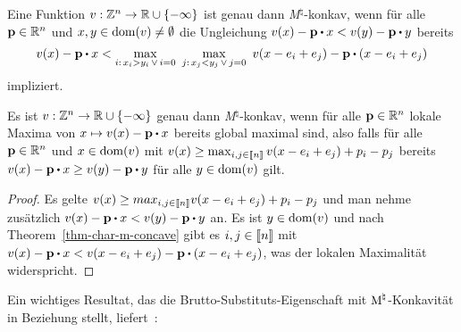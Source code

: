 \begin{theorem}[\cite{}]\label{thm-char-m-concave}
	Eine Funktion $v:\mathbb{Z}^n \rightarrow \mathbb{R} \cup \{ -\infty \}$ ist genau dann \emph{M}$^\natural$-konkav, wenn für alle $\mathbf{p}\in\mathbb{R}^n$ und $x,y\in\operatorname{dom}(v)\neq\emptyset$ die Ungleichung $v(x) - \fp\bcdot x < v(y) - \fp \bcdot y$ bereits \[ 
		v(x) - \fp\bcdot x < 
			\max_{i:\, x_i > y_i \,  \vee \, i = 0} \,\,
				\max_{j:\, x_j < y_j \, \vee \, j=0} \,\,
					v(x - e_i + e_j) - \fp \bcdot (x - e_i + e_j)
	\]
	impliziert.
\end{theorem}
\begin{korollar}\label{cor-concave-local-global}
	Es ist $v: \mathbb{Z}^n \rightarrow \mathbb{R} \cup \{ -\infty \}$ genau dann \emph{M}$^\natural$-konkav, wenn für alle $\mathbf{p}\in\mathbb{R}^n$ lokale Maxima von $x \mapsto v(x) - \fp \bcdot x$ bereits global maximal sind, also 
	falls für alle $\mathbf{p}\in\mathbb{R}^n$ und $x\in\operatorname{dom}(v)$ mit $
	v(x)\geq \max_{i,j\in\left\llbracket n \right\rrbracket} v(x - e_i + e_j) + p_i - p_j
	$
	bereits $v(x) - \fp \bcdot x \geq v(y) - \fp \bcdot y$ für alle $y\in\operatorname{dom}(v)$ gilt.
\end{korollar}
\begin{proof}
	Es gelte $v(x) \geq max_{i,j\in\left\llbracket n \right\rrbracket} v(x - e_i + e_j) + p_i - p_j$ und man nehme zusätzlich $v(x) - \fp\bcdot x < v(y) - \fp \bcdot y$ an.
	Es ist $y\in\operatorname{dom}(v)$ und nach Theorem~\ref{thm-char-m-concave} gibt es $i,j\in\left\llbracket n \right\rrbracket$ mit $v(x) - \fp \bcdot x < v(x - e_i + e_j) - \fp\bcdot (x - e_i + e_j)$, was der lokalen Maximalität widerspricht.
\end{proof}

Ein wichtiges Resultat, das die Brutto-Substituts-Eigenschaft mit $\textrm{\textup{M}}^\natural$-Konkavität in Beziehung stellt, liefert~\cite[Theorem 2.1]{Fujishige2003}:

